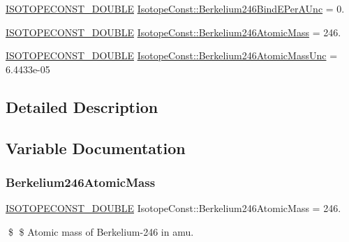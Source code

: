 \begin{DoxyCompactItemize}
\mbox{\hyperlink{group___isotope_const-_macros_ga8f45a7272ce02c0b4c65c44636ed719a}{I\+S\+O\+T\+O\+P\+E\+C\+O\+N\+S\+T\+\_\+\+D\+O\+U\+B\+LE}} \mbox{\hyperlink{group___isotope_const-_berkelium-_bk246_ga61946e6f683724c8168f6b04108f9535}{Isotope\+Const\+::\+Berkelium246\+Bind\+E\+Per\+A\+Unc}} = 0.
\item 
\mbox{\hyperlink{group___isotope_const-_macros_ga8f45a7272ce02c0b4c65c44636ed719a}{I\+S\+O\+T\+O\+P\+E\+C\+O\+N\+S\+T\+\_\+\+D\+O\+U\+B\+LE}} \mbox{\hyperlink{group___isotope_const-_berkelium-_bk246_ga938c11605ee7762db96b12c607fe411e}{Isotope\+Const\+::\+Berkelium246\+Atomic\+Mass}} = 246.
\item 
\mbox{\hyperlink{group___isotope_const-_macros_ga8f45a7272ce02c0b4c65c44636ed719a}{I\+S\+O\+T\+O\+P\+E\+C\+O\+N\+S\+T\+\_\+\+D\+O\+U\+B\+LE}} \mbox{\hyperlink{group___isotope_const-_berkelium-_bk246_ga7fa25b0e486ff04fbcaf90bfaac285e5}{Isotope\+Const\+::\+Berkelium246\+Atomic\+Mass\+Unc}} = 6.\+4433e-\/05
\end{DoxyCompactItemize}


\subsection{Detailed Description}


\subsection{Variable Documentation}
\mbox{\label{group___isotope_const-_berkelium-_bk246_ga938c11605ee7762db96b12c607fe411e}} 
\subsubsection{\texorpdfstring{Berkelium246\+Atomic\+Mass}{Berkelium246AtomicMass}}
{\footnotesize\ttfamily \mbox{\hyperlink{group___isotope_const-_macros_ga8f45a7272ce02c0b4c65c44636ed719a}{I\+S\+O\+T\+O\+P\+E\+C\+O\+N\+S\+T\+\_\+\+D\+O\+U\+B\+LE}} Isotope\+Const\+::\+Berkelium246\+Atomic\+Mass = 246.}

\$ \$ Atomic mass of Berkelium-\/246 in amu. \mbox{\label{group___isotope_const-_berkelium-_bk246_ga7fa25b0e486ff04fbcaf90bfaac285e5}} 

